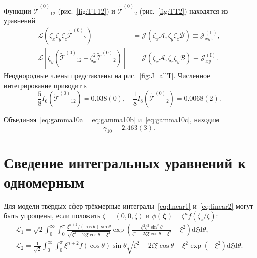 \documentclass[a4paper,12pt]{article}
\newcommand{\dd}{\mathrm{d}}
\newcommand{\bzeta}{\boldsymbol{\zeta}}
\newcommand{\TT}{\ensuremath{\tilde{\mathcal{T}}^{(0)}}}
\begin{document}
Функции \(\TT_{12}\) (рис.~\ref{fig:TT12}) и \(\TT_2\) (рис.~\ref{fig:TT2}) находятся из уравнений
\begin{align}
    \mathcal{L}\left( \zeta_x\zeta_y\zeta_z\TT_2 \right)
    	&= \mathcal{J}\left( \zeta_x\mathcal{A}, \zeta_y\zeta_z\mathcal{B} \right) \equiv \mathcal{J}_{xyz}^{(\mathrm{II})}, \label{eq:TT2}\\
    \mathcal{L}\left[ \zeta_y\left(\TT_{12} + \zeta_x^2\TT_2\right) \right]
        &= \mathcal{J}\left( \zeta_x\mathcal{A}, \zeta_x\zeta_y\mathcal{B} \right) \equiv \mathcal{J}_{xy}^{(\mathrm{I})}. \label{eq:TT12}
\end{align}
Неоднородные члены представлены на рис.~\ref{fig:J_allT}.
Численное интегрирование приводит к
\begin{equation}\label{eq:gamma10c}
    \frac58 I_6\left(\TT_{12}\right) = 0.038(0), \quad \frac18 I_8\left(\TT_2\right) = 0.0068(2).
\end{equation}

Объединяя~\eqref{eq:gamma10a},~\eqref{eq:gamma10b} и~\eqref{eq:gamma10c}, находим
\begin{equation}\label{eq:gamma_10_result}
    \gamma_{10} = 2.463(3).
\end{equation}

\section{Сведение интегральных уравнений к одномерным}

Для модели твёрдых сфер трёхмерные интегралы~\eqref{eq:linear1} и~\eqref{eq:linear2}
могут быть упрощены, если положить \(\zeta=(0,0,\zeta)\) и \(\phi(\bzeta) = \zeta^n f(\zeta_z/\zeta)\):
\begin{gather}
    \mathcal{L}_1 = \sqrt2 \int_0^\infty \int_0^\pi
        \frac{\xi^{n+2}f(\cos\theta)\sin\theta}{\sqrt{\zeta^2-2\zeta\xi\cos\theta+\xi^2}}
        \exp\left( \frac{\zeta^2\xi^2\sin^2\theta}{\zeta^2-2\zeta\xi\cos\theta+\xi^2} -\xi^2 \right)
        \dd\xi\dd\theta, \label{eq:linear1_sph}\\
    \mathcal{L}_2 = \frac1{\sqrt2} \int_0^\infty \int_0^\pi
        \xi^{n+2}f(\cos\theta)\sin\theta\sqrt{\zeta^2-2\zeta\xi\cos\theta+\xi^2}
        \exp\left(-\xi^2\right) \dd\xi\dd\theta. \label{eq:linear2_sph}
\end{gather}
\end{document}
